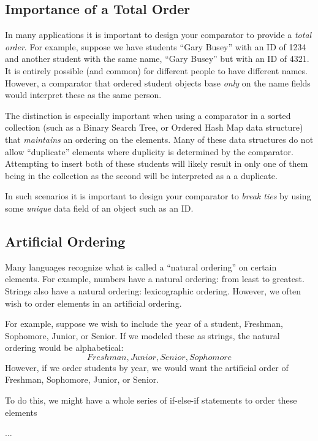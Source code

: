 \subsection{Importance of a Total Order}

In many applications it is important to design your comparator to
provide a \emph{total order}.  For example, suppose we have students
``Gary Busey'' with an ID of 1234 and another student with the same
name, ``Gary Busey'' but with an ID of 4321.  It is entirely possible
(and common) for different people to have different names.  However,
a comparator that ordered student objects base \emph{only} on the
name fields would interpret these as the same person.  

The distinction is especially important when using a comparator in a
sorted collection (such as a Binary Search Tree, or Ordered Hash Map
data structure) that \emph{maintains} an ordering on the elements.
Many of these data structures do not allow ``duplicate'' elements where
duplicity is determined by the comparator.  Attempting to insert both
of these students will likely result in only one of them being in
the collection as the second will be interpreted as a a duplicate.

In such scenarios it is important to design your comparator to 
\emph{break ties} by using some \emph{unique} data field of an object
such as an ID.

\subsection{Artificial Ordering}

Many languages recognize what is called a ``natural ordering'' on certain
elements.  For example, numbers have a natural ordering: from least to
greatest.  Strings also have a natural ordering: lexicographic ordering.
However, we often wish to order elements in an artificial ordering.

For example, suppose we wish to include the year of a student, Freshman,
Sophomore, Junior, or Senior.  If we modeled these as strings, the
natural ordering would be alphabetical:
  $$Freshman, Junior, Senior, Sophomore$$
However, if we order students by year, we would want the artificial
order of Freshman, Sophomore, Junior, or Senior.  

To do this, we might have a whole series of if-else-if statements to
order these elements
\begin{algorithm}[H]
$\ldots$
\end{algorithm}

